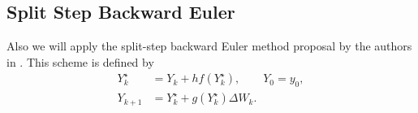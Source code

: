 \subsection*{Split Step Backward Euler}
	Also we will apply the split-step backward Euler method proposal by the authors in \cite{Higham2002b}. 
	This scheme is defined by  
	\begin{align}
		Y_k^{\star} &= Y_k + hf(Y^{\star}_k), \qquad Y_0 = y_0,
		\label{eqn:SSEM1}\\
		Y_{k+1}	&= Y_k^{\star} + g(Y_k^{\star})\Delta W_k \label{eqn:SSEM2}. 
	\end{align}
